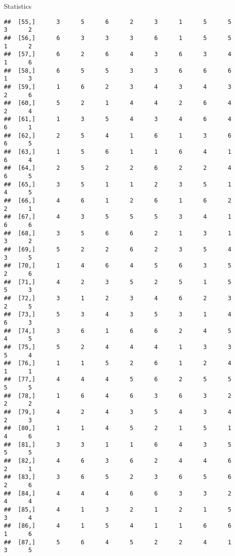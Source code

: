 \documentclass[
  ignorenonframetext,
]{beamer}
\begin{document}
\begin{frame}[fragile]{Statistics}
\begin{verbatim}
##  [55,]      3      5      6      2      3      1      5      5      3      2
##  [56,]      6      3      3      3      6      1      5      5      1      2
##  [57,]      6      2      6      4      3      6      3      4      1      6
##  [58,]      6      5      5      3      3      6      6      6      1      3
##  [59,]      1      6      2      3      4      3      4      3      2      6
##  [60,]      5      2      1      4      4      2      6      4      2      4
##  [61,]      1      3      5      4      3      4      6      4      6      1
##  [62,]      2      5      4      1      6      1      3      6      6      5
##  [63,]      1      5      6      1      1      6      4      1      6      4
##  [64,]      2      5      2      2      6      2      2      4      6      5
##  [65,]      3      5      1      1      2      3      5      1      4      5
##  [66,]      4      6      1      2      6      1      6      2      2      1
##  [67,]      4      3      5      5      5      3      4      1      6      6
##  [68,]      3      5      6      6      2      1      3      1      3      2
##  [69,]      5      2      2      6      2      3      5      4      3      5
##  [70,]      1      4      6      4      5      6      3      5      2      6
##  [71,]      4      2      3      5      2      5      1      5      5      3
##  [72,]      3      1      2      3      4      6      2      3      2      5
##  [73,]      5      3      4      3      5      3      1      4      6      3
##  [74,]      3      6      1      6      6      2      4      5      4      5
##  [75,]      5      2      4      4      4      1      3      3      5      4
##  [76,]      1      1      5      2      6      1      2      4      1      1
##  [77,]      4      4      4      5      6      2      5      5      5      5
##  [78,]      1      6      4      6      3      6      3      2      2      2
##  [79,]      4      2      4      3      5      4      3      4      2      3
##  [80,]      1      1      4      5      2      1      5      1      4      6
##  [81,]      3      3      1      1      6      4      3      5      5      5
##  [82,]      4      6      3      6      2      4      4      6      2      1
##  [83,]      3      6      5      2      3      6      5      6      2      6
##  [84,]      4      4      4      6      6      3      3      2      4      4
##  [85,]      4      1      3      2      1      2      1      5      3      4
##  [86,]      4      1      5      4      1      1      6      6      1      6
##  [87,]      5      6      4      5      2      2      4      1      3      5

\end{verbatim}
\end{frame}
\end{document}
